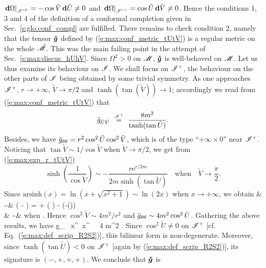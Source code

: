$\left.\mathbf{d}\Omega\right|_{{\mathscr{I}'}^+} = -\cos\tilde{V}\, \mathbf{d}\tilde{U}\not=0$ and
$\left.\mathbf{d}\Omega\right|_{{\mathscr{I}'}^-} = \cos\tilde{U}\, \mathbf{d}\tilde{V}\not=0$.
Hence the conditions 1, 3 and 4 of the definition of a conformal completion
given in Sec.~\ref{s:glo:conf_compl} are fulfilled. There remains to check
condition 2, namely that the tensor $\bm{\tilde{g}}$ defined
by (\ref{e:max:conf_metric_tUtV}) is a regular metric on the whole $\tilde{\mathscr{M}}$.
This was the main failing point in the attempt of Sec.~\ref{s:max:discus_hUhV}.
Since $\Omega^2 > 0$ on $\mathscr{M}$, $\bm{\tilde{g}}$ is well-behaved on $\mathscr{M}$. Let us
thus examine its behaviour on $\mathscr{I}$. We shall focus
on $\mathscr{I}^+$, the behaviour on the other parts of $\mathscr{I}$ being obtained by
some trivial symmetry. As one approaches $\mathscr{I}^+$, $r\rightarrow +\infty$,
$\tilde{V}\rightarrow \pi/2$ and $\tanh(\tan(\tilde{V}))\rightarrow 1$;
accordingly
we read from (\ref{e:max:conf_metric_tUtV}) that
\[
    \tilde{g}_{\tilde{U}\tilde{V}}
    \ \stackrel{\mathscr{I}^+}{=}\  \frac{8 m^2}{\tanh(\tan\tilde{U})} .
\]
Besides, we have
$\tilde{g}_{\theta\theta} = r^2 \cos^2\tilde{U}\cos^2\tilde{V}$, which is of the type
``$+\infty \times 0$'' near $\mathscr{I}^+$. Noticing that
$\tan\tilde{V}\sim 1/\cos\tilde{V}$ when $\tilde{V}\rightarrow \pi/2$, we get
from (\ref{e:max:exp_r_tUtV})
\[
    \sinh\left(\frac{1}{\cos\tilde{V}}\right) \sim - \frac{r \mathrm{e}^{r/2m}}{2m\sinh(\tan\tilde{U})}
        \quad \mbox{when} \quad \tilde{V}\rightarrow \frac{\pi}{2} .
\]
Since $\mathrm{arsinh}(x) = \ln(x + \sqrt{x^2+1}) \sim \ln (2x)$ when $x\rightarrow +\infty$,
we obtain
\bea
     & \sim & \ln\left( -  \right)
        =  + \ln \left(  \right) - \ln\left(-\sinh(\tan{})\right) \nonumber \\
        & \sim &  \quad \mbox{when} \quad {}\rightarrow {} .
            \nonumber
\eea
Hence $\cos^2\tilde{V} \sim 4m^2 / r^2$ and $\tilde{g}_{\theta\theta} \sim 4 m^2 \cos^2\tilde{U}$.
Gathering the above results, we have
\be
   {\tilde g}_{\mu\nu} \, \D x^\mu \, \D x^\nu
   \ \stackrel{\scri^+}{=}\  4 m^2  .
\ee
Since $\cos^2\tilde{U} \not=0$ on $\mathscr{I}^+$ [cf. Eq.~(\ref{e:max:def_scrip_R2S2})],
this bilinear form is non-degenerate.
Moreover, since $\tanh(\tan\tilde{U})<0$ on $\mathscr{I}^+$ [again by (\ref{e:max:def_scrip_R2S2})], its
signature is $(-,+,+,+)$.
We conclude that $\bm{\tilde{g}}$ is
